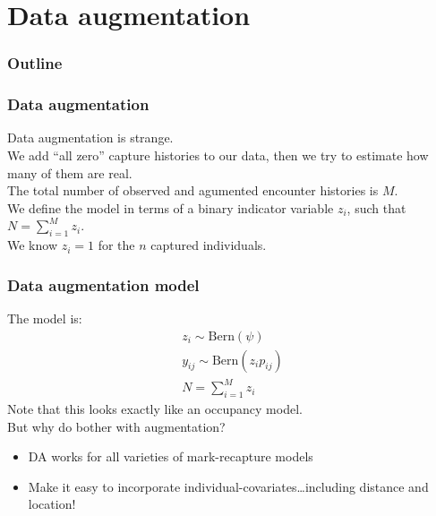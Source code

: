 \documentclass[color=usenames,dvipsnames]{beamer}\usepackage[]{graphicx}\usepackage[]{color}
\begin{document}
\section{Data augmentation}




\begin{frame}
  \frametitle{Outline}
  \Large
  \tableofcontents[currentsection]
\end{frame}



\begin{frame}
  \frametitle{Data augmentation}
  Data augmentation is strange. \\
  \pause
  \vfill
  We add ``all zero'' capture histories to our data, then we try to
  estimate how many of them are real. \\ 
  \pause
  \vfill
  The total number of observed and agumented encounter histories is
  $M$. \\
  \pause
  \vfill
  We define the model in terms of a binary indicator variable $z_i$,
  such that $N=\sum_{i=1}^M z_i$. \\
  \pause
  \vfill
  We know $z_i=1$ for the $n$ captured individuals. \\
\end{frame}




\begin{frame}
  \frametitle{Data augmentation model}
  The model is:
  \begin{gather*}
    z_i \sim \mathrm{Bern}(\psi) \\
    y_{ij} \sim \mathrm{Bern}(z_i p_{ij}) \\
    N=\sum_{i=1}^M z_i
  \end{gather*}
  \pause \vfill
  Note that this looks exactly like an occupancy model. \\
  \pause \vfill
  But why do bother with augmentation?
  \begin{itemize}
    \item DA works for \alert{all} varieties of mark-recapture models
    \item Make it easy to incorporate
      individual-covariates\dots\pause including distance and
      location!   
  \end{itemize}
\end{frame}
\end{document}
